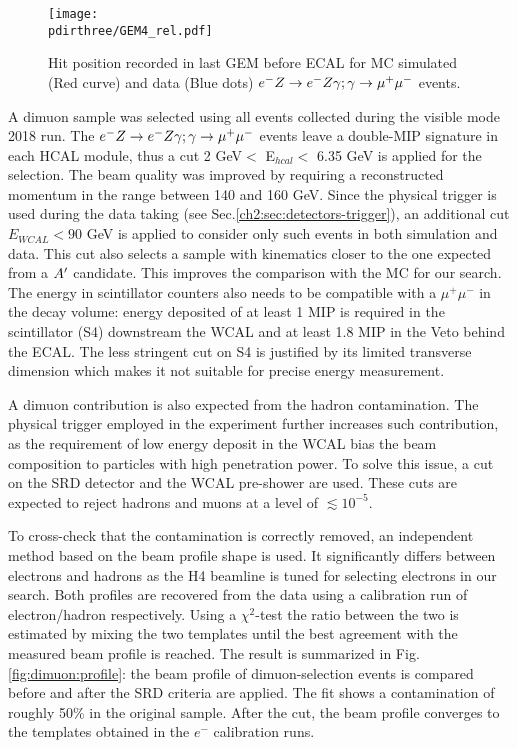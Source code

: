 \begin{figure}[tbh!]
  \begin{center}
    \texttt{[image: \\pdirthree/GEM4\_rel.pdf]}
  \end{center}
  \caption[Hit position of $\emu$ in GEM MC-DATA]{Hit position recorded in last GEM before ECAL for MC simulated (Red curve) and data (Blue dots) $\emu$ events.}
  \label{fig:dimuon:gemspectra}
\end{figure}
  

A dimuon sample was selected using all events collected during the visible mode 2018 run. The $\emu$ events leave a double-MIP signature in each HCAL module, thus a cut 2 GeV$<$ E$_{hcal} <$ 6.35 GeV is applied for the selection. The beam quality was improved by requiring a reconstructed momentum in the range between 140 and 160 GeV. Since the physical trigger is used during the data taking (see Sec.\ref{ch2:sec:detectors-trigger}), an additional cut $E_{WCAL} < 90$ GeV is applied to consider only such events in both simulation and data. This cut also selects a sample with kinematics closer to the one expected from a $A'$ candidate. This improves the comparison with the MC for our search. The energy in scintillator counters also needs to be compatible with a $\mu^+ \mu^-$ in the decay volume: energy deposited of at least 1 MIP is required in the scintillator (S4) downstream the WCAL and at least 1.8 MIP in the Veto behind the ECAL. 
The less stringent cut on S4 is justified by its limited transverse dimension which makes it not suitable for precise energy measurement.

A dimuon contribution is also expected from the hadron contamination. The physical trigger employed in the experiment further increases such contribution, as the requirement of low energy deposit in the WCAL bias the beam composition to particles with high penetration power. To solve this issue, a cut on the SRD detector and the WCAL pre-shower are used. These cuts are expected to reject hadrons and muons at a level of $\lesssim10^{-5}$.

To cross-check that the contamination is correctly removed, an independent method based on the beam profile shape is used. It significantly differs between electrons and hadrons as the H4 beamline is tuned for selecting electrons in our search. Both profiles are recovered from the data using a calibration run of electron/hadron respectively. Using a  $\chi^2$-test the ratio between the two is estimated by mixing the two templates until the best agreement with the measured beam profile is reached. The result is summarized in Fig.\ref{fig:dimuon:profile}: the beam profile of dimuon-selection events is compared before and after the SRD criteria are applied. The fit shows a contamination of roughly 50\% in the original sample. After the cut, the beam profile converges to the templates obtained in the $e^-$ calibration runs.

